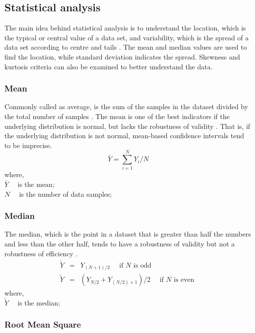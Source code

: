 \subsection{Statistical analysis}

The main idea behind statistical analysis is to understand the location, which is the typical or central value of a data set, and variability, which is the spread of a data set according to centre and tails \cite{croarkin2012handbook}. The mean and median values are used to find the location, while standard deviation indicates the spread. Skewness and kurtosis criteria can also be examined to better understand the data. 

\subsubsection{Mean}

Commonly called as average, is the sum of the samples in the dataset divided by the total number of samples \cite{shukla2015analysis}. The mean is one of the best indicators if the underlying distribution is normal, but lacks the robustness of validity \cite{croarkin2012handbook}. That is, if the underlying distribution is not normal, mean-based confidence intervals tend to be imprecise.
\begin{equation}
\bar{Y}=\sum_{i=1}^{N} Y_{i} / N
\label{mean}
\end{equation}
where,\\
$\bar{Y} \quad$ is the mean;\\
$N \quad$ is the number of data samples;
\pagebreak
\subsubsection{Median}

The median, which is the point in a dataset that is greater than half the numbers and less than the other half, tends to have a robustness of validity but not a robustness of efficiency \cite{croarkin2012handbook,shukla2015analysis}.
\begin{eqnarray}
\tilde{Y} &=& Y_{(N+1) / 2} \quad \text { if } N \text { is odd }\\
\tilde{Y} &=& \left(Y_{N / 2}+Y_{(N / 2)+1}\right) / 2 \quad \text { if } N \text { is even }
\label{median}
\end{eqnarray}
where,\\
$\tilde{Y} \quad$ is the median;
\subsubsection{Root Mean Square}

